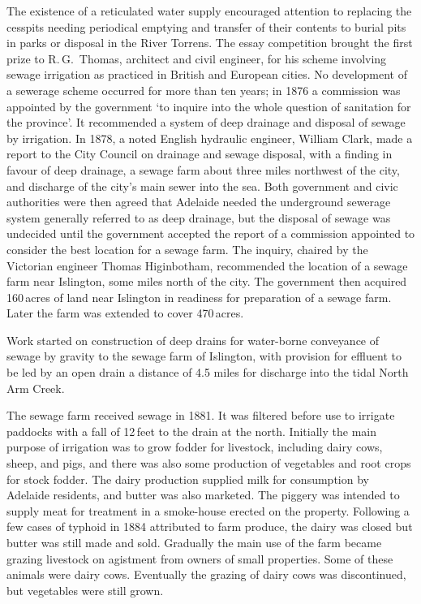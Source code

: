 The existence of a reticulated water supply encouraged attention to
replacing the cesspits needing periodical emptying and transfer of
their contents to burial pits in parks or disposal in the River
Torrens.   The essay competition brought the
first prize to R.\,G.~Thomas,   architect and
civil engineer, for his scheme involving sewage irrigation as
practiced in British and European cities.
No development of a sewerage scheme occurred for more than ten years;
in 1876 a commission was appointed by the government `to inquire into
the whole question of sanitation for the province'.  It recommended a
system of deep drainage and disposal of sewage by
irrigation.  In 1878, a noted English hydraulic engineer, William
Clark,   made a report to the City Council on
drainage and sewage disposal, with a finding in favour of deep
drainage, a sewage farm about three miles northwest of the city, and
discharge of the city's main sewer into the sea.  Both government and
civic authorities were then agreed that Adelaide needed the
underground sewerage system generally referred to as deep
drainage, but the disposal of sewage was undecided
until the government accepted the report of a commission appointed to
consider the best location for a sewage farm.  The inquiry, chaired by
the Victorian engineer Thomas Higinbotham, 
recommended the location of a sewage farm near Islington, some miles
north of the city.  The government then acquired 160\,acres of land
near Islington in readiness for preparation of a sewage farm. Later
the farm was extended to cover 470\,acres.

Work started on construction of deep drains for water-borne conveyance
of sewage by gravity to the sewage farm of Islington,  with provision for effluent to be led by an open
drain a distance of 4.5 miles for discharge into the tidal North Arm
Creek. 

The sewage farm received sewage in 1881.  It was filtered before use
to irrigate paddocks with a fall of 12\,feet to the drain at the
north.  Initially the main purpose of irrigation was to grow
fodder for livestock, including dairy cows,
sheep, and pigs, and there was also some production of
vegetables and root crops for stock fodder.  The
dairy production supplied milk for consumption by Adelaide residents,
and butter was also marketed.  The piggery was intended to supply meat
for treatment in a smoke-house erected on the property.  Following a
few cases of typhoid in 1884 attributed to farm
produce, the dairy was closed but butter was still made and sold.
Gradually the main use of the farm became grazing livestock on
agistment from owners of small properties.  Some of these animals were
dairy cows.  Eventually the grazing of dairy cows was
discontinued, but vegetables were still
grown.

